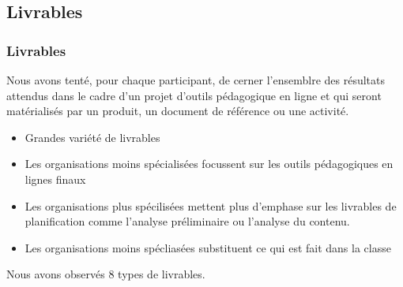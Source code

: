 						
						 \subsection{Livrables} 
						\begin{frame}[allowframebreaks]
						\frametitle{Livrables}
                        			Nous avons tenté, pour chaque participant, de cerner l’ensemblre des résultats attendus dans le cadre d’un projet d’outils pédagogique en ligne et qui seront matérialisés par un produit, un document de référence ou une activité.
						\begin{itemize}
							\item Grandes variété de livrables
							\item Les organisations moins spécialisées focussent sur les outils pédagogiques en lignes finaux
							\item Les organisations plus spécilisées mettent plus d'emphase sur les livrables de planification comme l'analyse préliminaire ou l'analyse du contenu.
							\item Les organisations moins spécliasées substituent ce qui est fait dans la classe
						\end{itemize}		
						Nous avons observés 8 types de livrables.
						
						
					\end{frame}

